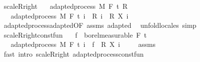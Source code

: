 \begin{isabellebody}
\isadelimproof
%
\endisadelimproof
\isanewline
\isanewline
{}\isamarkupfalse%
\ scaleR{\isacharunderscore}{\kern0pt}right{\isacharcolon}{\kern0pt}\isanewline
\ \ \ {\isachardoublequoteopen}adapted{\isacharunderscore}{\kern0pt}process\ M\ F\ t\ R{\isachardoublequoteclose}\isanewline
\ \ \ {\isachardoublequoteopen}adapted{\isacharunderscore}{\kern0pt}process\ M\ F\ t\ {\isacharparenleft}{\kern0pt}{\isasymlambda}i\ {\isasymxi}{\isachardot}{\kern0pt}\ {\isacharparenleft}{\kern0pt}R\ i\ {\isasymxi}{\isacharparenright}{\kern0pt}\ {\isacharasterisk}{\kern0pt}\isactrlsub R\ {\isacharparenleft}{\kern0pt}X\ i\ {\isasymxi}{\isacharparenright}{\kern0pt}{\isacharparenright}{\kern0pt}{\isachardoublequoteclose}\isanewline
%
\isadelimproof
\ \ %
\endisadelimproof
%
\isatagproof
{}\isamarkupfalse%
\ adapted{\isacharunderscore}{\kern0pt}process{\isachardot}{\kern0pt}adapted{\isacharbrackleft}{\kern0pt}OF\ assms{\isacharbrackright}{\kern0pt}\ adapted\ \isamarkupfalse%
\ {\isacharparenleft}{\kern0pt}unfold{\isacharunderscore}{\kern0pt}locales{\isacharparenright}{\kern0pt}\ simp%
\endisatagproof
{\isafoldproof}%
%
\isadelimproof
\isanewline
%
\endisadelimproof
\ \ \isanewline
{}\isamarkupfalse%
\ scaleR{\isacharunderscore}{\kern0pt}right{\isacharunderscore}{\kern0pt}const{\isacharunderscore}{\kern0pt}fun{\isacharcolon}{\kern0pt}\isanewline
\ \ \ {\isachardoublequoteopen}f\ {\isasymin}\ borel{\isacharunderscore}{\kern0pt}measurable\ {\isacharparenleft}{\kern0pt}F\ t\ \isanewline
\ \ \ {\isachardoublequoteopen}adapted{\isacharunderscore}{\kern0pt}process\ M\ F\ t\ {\isacharparenleft}{\kern0pt}{\isasymlambda}i\ {\isasymxi}{\isachardot}{\kern0pt}\ f\ {\isasymxi}\ {\isacharasterisk}{\kern0pt}\isactrlsub R\ {\isacharparenleft}{\kern0pt}X\ i\ {\isasymxi}{\isacharparenright}{\kern0pt}{\isacharparenright}{\kern0pt}{\isachardoublequoteclose}\isanewline
%
\isadelimproof
\ \ %
\endisadelimproof
%
\isatagproof
{}\isamarkupfalse%
\ assms\ \isamarkupfalse%
\ {\isacharparenleft}{\kern0pt}fast\ intro{\isacharcolon}{\kern0pt}\ scaleR{\isacharunderscore}{\kern0pt}right\ adapted{\isacharunderscore}{\kern0pt}process{\isacharunderscore}{\kern0pt}const{\isacharunderscore}{\kern0pt}fun{\isacharparenright}{\kern0pt}%
\endisatagproof
{\isafoldproof}%
%
\isadelimproof
\isanewline

\end{isabellebody}
